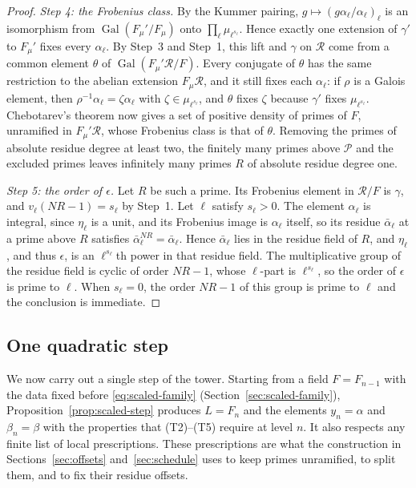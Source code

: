 \documentclass[11pt]{article}
\theoremstyle{plain}
\theoremstyle{definition}
\theoremstyle{remark}
\DeclareMathOperator{\Gal}{Gal}
\begin{document}
\begin{proof}
\emph{Step 4: the Frobenius class.}  By the Kummer pairing,
$g\mapsto(g\alpha_\ell/\alpha_\ell)_\ell$ is an isomorphism from
$\Gal(F_\mu'/F_\mu)$ onto $\prod_\ell\mu_{\ell^{s_\ell}}$.  Hence exactly
one extension of $\gamma'$ to $F_\mu'$ fixes every $\alpha_\ell$.  By
Step~3 and Step~1, this lift and $\gamma$ on $\mathcal R$ come from a
common element $\theta$ of $\Gal(F_\mu'\mathcal R/F)$.  Every conjugate of
$\theta$ has the same restriction to the abelian extension $F_\mu\mathcal
R$, and it still fixes each $\alpha_\ell$: if $\rho$ is a Galois element,
then $\rho^{-1}\alpha_\ell=\zeta\alpha_\ell$ with
$\zeta\in\mu_{\ell^{s_\ell}}$, and $\theta$ fixes $\zeta$ because
$\gamma'$ fixes $\mu_{\ell^{s_\ell}}$.  Chebotarev's theorem now gives a
set of positive density of primes of $F$, unramified in $F_\mu'\mathcal
R$, whose Frobenius class is that of $\theta$.  Removing the primes of
absolute residue degree at least two, the finitely many primes above
$\mathcal P$ and the excluded primes leaves
infinitely many primes $R$ of absolute residue degree one.

\emph{Step 5: the order of $\epsilon$.}  Let $R$ be such a prime.  Its
Frobenius element in $\mathcal R/F$ is $\gamma$, and
$v_\ell(NR-1)=s_\ell$ by Step~1.  Let $\ell$ satisfy $s_\ell>0$.  The
element $\alpha_\ell$ is integral, since $\eta_\ell$ is a unit, and its
Frobenius image is $\alpha_\ell$ itself, so its residue $\bar\alpha_\ell$
at a prime above $R$ satisfies $\bar\alpha_\ell^{NR}=\bar\alpha_\ell$.
Hence $\bar\alpha_\ell$ lies in the residue field of $R$, and $\eta_\ell$,
and thus $\epsilon$, is an $\ell^{s_\ell}$th power in that residue field.
The multiplicative group of the residue field is cyclic of order $NR-1$,
whose $\ell$-part is $\ell^{s_\ell}$, so the order of $\epsilon$ is prime
to $\ell$.  When $s_\ell=0$, the order $NR-1$ of this group is prime to
$\ell$ and the conclusion is immediate.
\end{proof}

\subsection{One quadratic step}\label{sec:one-step}
We now carry out a single step of the tower.  Starting from a field
$F=F_{n-1}$ with the data fixed before \eqref{eq:scaled-family}
(Section~\ref{sec:scaled-family}),
Proposition~\ref{prop:scaled-step} produces $L=F_n$ and the elements
$y_n=\alpha$ and $\beta_n=\beta$ with the properties that (T2)--(T5)
require at level $n$.  It also respects any finite list of local
prescriptions.  These prescriptions are what the construction in
Sections~\ref{sec:offsets} and~\ref{sec:schedule} uses to keep primes
unramified, to split them, and to fix their residue offsets.
\end{document}
